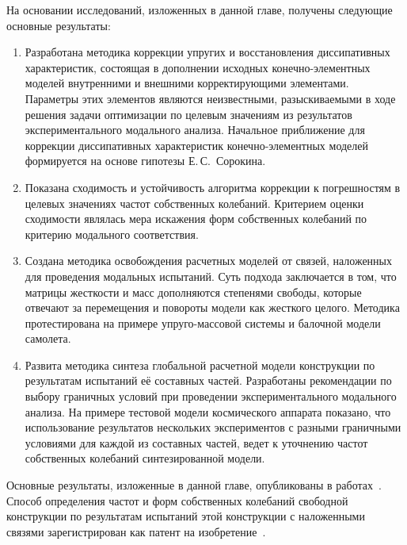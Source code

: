На основании исследований, изложенных в данной главе, получены следующие основные результаты:
\begin{enumerate}
	\item Разработана методика коррекции упругих и восстановления диссипативных характеристик, состоящая в дополнении исходных конечно-элементных моделей внутренними и внешними корректирующими элементами. Параметры этих элементов являются неизвестными, разыскиваемыми в ходе решения задачи оптимизации по целевым значениям из результатов экспериментального модального анализа. Начальное приближение для коррекции диссипативных характеристик конечно-элементных моделей формируется на основе гипотезы Е.\,С.~Сорокина.
	\item Показана сходимость и устойчивость алгоритма коррекции к погрешностям в целевых значениях частот собственных колебаний. Критерием оценки сходимости являлась мера искажения форм собственных колебаний по критерию модального соответствия.
	\item Создана методика освобождения расчетных моделей от связей, наложенных для проведения модальных испытаний. Суть подхода заключается в том, что матрицы жесткости и масс дополняются степенями свободы, которые отвечают за перемещения и повороты модели как жесткого целого. Методика протестирована на примере упруго-массовой системы и балочной модели самолета.
	\item Развита методика синтеза глобальной расчетной модели конструкции по результатам испытаний её составных частей. Разработаны рекомендации по выбору граничных условий при проведении экспериментального модального анализа. На примере тестовой модели космического аппарата показано, что использование результатов нескольких экспериментов с разными граничными условиями для каждой из составных частей, ведет к уточнению частот собственных колебаний синтезированной модели.
\end{enumerate}

Основные результаты, изложенные в данной главе, опубликованы в работах~\cite{lib:author:iss2018:synthesis, lib:author:spacecraft:cms, lib:author:nstuEn:synthesis, lib:author:samsc:freeing, lib:author:nstuEn:updating, lib:author:iss2019:synthesis, lib:author:nti2019:updating, lib:author:nsu:synthesis, lib:author:nti2020:updating, lib:author:patent:freeing, lib:author:pnrpu:updating}. Способ определения частот и форм собственных колебаний свободной конструкции по результатам испытаний этой конструкции с наложенными связями зарегистрирован как патент на изобретение~.